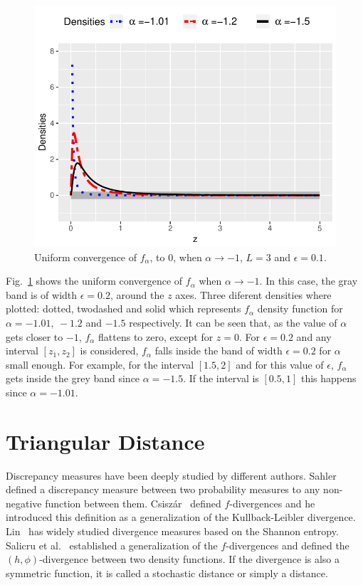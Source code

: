 \documentclass[journal]{IEEEtran}
\numberwithin{equation}{section}
\begin{document}
\begin{figure}[hbt]
	\centering    
	\includegraphics[width=\linewidth]{../../../Figures/DTTeorico/ConvUnifEnCero.pdf}
	\caption{\label{ConvEnCero}Uniform convergence of $f_{\alpha}$, to $0$, when $\alpha \to -1$, $L=3$ and $\epsilon=0.1$.}
\end{figure}

Fig.~\ref{ConvEnCero} shows the uniform convergence of $f_{\alpha}$ when $\alpha \to -1$. In this case, the gray band is of width $\epsilon=0.2$, around the $z$ axes. Three diferent densities where plotted: dotted, twodashed and solid which represents $f_{\alpha}$ density function for $\alpha=-1.01, \ -1.2$ and $-1.5$ respectively. It can be seen that, as the value of $\alpha$ gets closer to $-1$, $f_{\alpha}$ flattens to zero, except for $z=0$. For  $\epsilon=0.2$ and any interval $[z_1,z_2]$ is considered, $f_{\alpha}$ falls inside the band of width $\epsilon=0.2$ for $\alpha$ small enough. For example, for the interval $[1.5,2]$ and for this value of $\epsilon$, $f_{\alpha}$ gets inside the grey band since $\alpha=-1.5$. If the interval is $[0.5,1]$ this happens since $\alpha=-1.01$.
\section{Triangular Distance}
\label{DTsection}

Discrepancy measures have been deeply studied by different authors. Sahler~\cite{Sahler1970} defined a discrepancy measure between two probability measures to any non-negative
function between them. Csisz\'ar~\cite{Csiszar1967} defined $f$-divergences and he introduced this definition as a generalization of the Kullback-Leibler divergence. Lin~\cite{Lin1991} has widely studied divergence measures based on the Shannon entropy.  Salicru et al.~\cite{Salicru1994} established a generalization of the $f$-divergences and defined the $(h,\phi)$-divergence between two density functions. If the divergence is also a symmetric function, it is called a stochastic distance or simply a distance.
\end{document}
